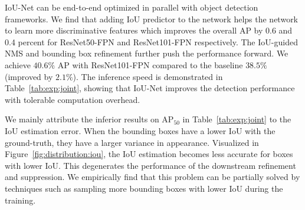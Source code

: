 \documentclass[runningheads]{llncs}
\begin{document}
IoU-Net can be end-to-end optimized in parallel with object detection frameworks. We find that adding IoU predictor to the network helps the network to learn more discriminative features which improves the overall AP by 0.6 and 0.4 percent for ResNet50-FPN and ResNet101-FPN respectively. The IoU-guided NMS and bounding box refinement further push the performance forward. We achieve $40.6\%$ AP with ResNet101-FPN compared to the baseline $38.5\%$ (improved by $2.1\%$). The inference speed is demonstrated in Table~\ref{tab:exp:joint}, showing that IoU-Net improves the detection performance with tolerable computation overhead.

We mainly attribute the inferior results on AP${}_{50}$ in Table~\ref{tab:exp:joint} to the IoU estimation error. When the bounding boxes have a lower IoU with the ground-truth, they have a larger variance in appearance. Visualized in Figure~\ref{fig:distribution:iou}, the IoU estimation becomes less accurate for boxes with lower IoU. This degenerates the performance of the downstream refinement and suppression. We empirically find that this problem can be partially solved by techniques such as sampling more bounding boxes with lower IoU during the training.

\begin{table}[!t]
\centering
{}
\caption{Final experiment results on MS-COCO. IoU-Net denotes ResNet-FPN embedded with IoU predictor. We improve the FPN baseline by $\approx 2\%$ in AP.}
\label{tab:exp:joint}
\end{table}
\end{document}

